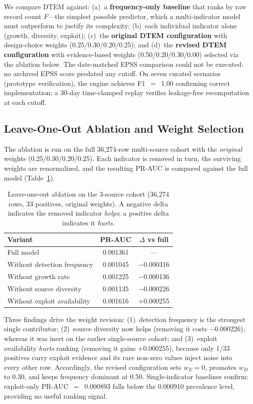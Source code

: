 \documentclass[conference]{IEEEtran}
\begin{document}
We compare DTEM against: (a)~a \textbf{frequency-only baseline} that ranks by raw record count $F$---the simplest possible predictor, which a multi-indicator model must outperform to justify its complexity; (b)~each individual indicator alone (growth, diversity, exploit); (c)~the \textbf{original DTEM configuration} with design-choice weights (0.25/0.30/0.20/0.25); and (d)~the \textbf{revised DTEM configuration} with evidence-based weights (0.50/0.20/0.30/0.00) selected via the ablation below. The date-matched EPSS comparison could not be executed: no archived EPSS score predated any cutoff. On seven curated scenarios (prototype verification), the engine achieves F1~$=$~1.00 confirming correct implementation; a 30-day time-clamped replay verifies leakage-free recomputation at each cutoff.

\subsection{Leave-One-Out Ablation and Weight Selection}
\label{sec:ablation}

The ablation is run on the full 36{,}274-row multi-source cohort with the \emph{original} weights (0.25/0.30/0.20/0.25). Each indicator is removed in turn, the surviving weights are renormalized, and the resulting PR-AUC is compared against the full model (Table~\ref{tab:ablation}).

\begin{table}[htbp]
\centering
\caption{Leave-one-out ablation on the 3-source cohort (36{,}274 rows, 33 positives, original weights). A negative delta indicates the removed indicator \emph{helps}; a positive delta indicates it \emph{hurts}.}
\label{tab:ablation}
\begin{tabular}{|l|c|c|}
\hline
\textbf{Variant} & \textbf{PR-AUC} & \textbf{$\Delta$ vs full} \\
\hline
Full model & 0.001361 & --- \\
Without detection frequency & 0.001045 & $-$0.000316 \\
Without growth rate & 0.001225 & $-$0.000136 \\
Without source diversity & 0.001135 & $-$0.000226 \\
Without exploit availability & 0.001616 & $+$0.000255 \\
\hline
\end{tabular}
\end{table}

Three findings drive the weight revision: (1)~detection frequency is the strongest single contributor; (2)~source diversity now helps (removing it costs $-$0.000226), whereas it was inert on the earlier single-source cohort; and (3)~exploit availability \emph{hurts} ranking (removing it gains $+$0.000255), because only 1/33 positives carry exploit evidence and its rare non-zero values inject noise into every other row. Accordingly, the revised configuration sets $w_E=0$, promotes $w_D$ to 0.30, and keeps frequency dominant at 0.50. Single-indicator baselines confirm: exploit-only PR-AUC~$=$~0.000893 falls below the 0.000910 prevalence level, providing no useful ranking signal.
\end{document}
